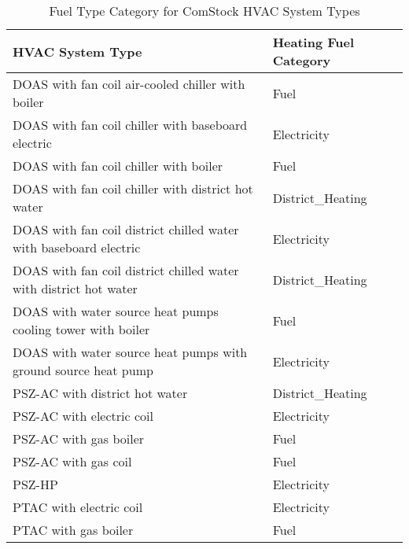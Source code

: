 \begin{table}[hb!]
\small
\centering
\caption[Fuel Type Category for ComStock HVAC System Types]{Fuel Type Category for ComStock HVAC System Types}
\label{tab:hvac_system_heating_fuel_categories}
\begin{tabular}{|l|l|}
\hline
\textbf{HVAC System Type}                                         & \textbf{Heating Fuel Category} \\ \hline
DOAS with fan coil air-cooled chiller   with boiler                 & Fuel                             \\ \hline
DOAS with fan coil chiller with baseboard   electric                & Electricity                      \\ \hline
DOAS with fan coil chiller with boiler                              & Fuel                             \\ \hline
DOAS with fan coil chiller with district   hot water                & District\_Heating                \\ \hline
DOAS with fan coil district chilled water   with baseboard electric & Electricity                      \\ \hline
DOAS with fan coil district chilled water   with district hot water & District\_Heating                \\ \hline
DOAS with water source heat pumps cooling   tower with boiler       & Fuel                             \\ \hline
DOAS with water source heat pumps with   ground source heat pump    & Electricity                      \\ \hline
PSZ-AC with district hot water                                      & District\_Heating                \\ \hline
PSZ-AC with electric coil                                           & Electricity                      \\ \hline
PSZ-AC with gas boiler                                              & Fuel                             \\ \hline
PSZ-AC with gas coil                                                & Fuel                             \\ \hline
PSZ-HP                                                              & Electricity                      \\ \hline
PTAC with electric coil                                             & Electricity                      \\ \hline
PTAC with gas boiler                                                & Fuel                             \\ \hline

\end{tabular}
\end{table}
